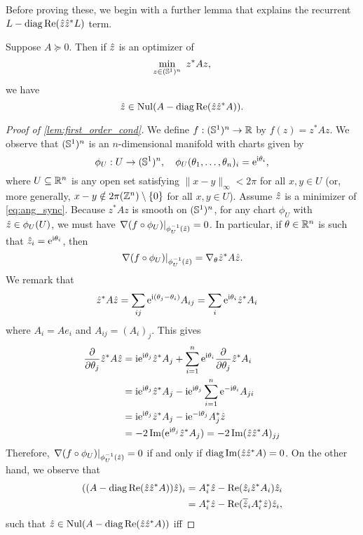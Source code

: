 Before proving these, we begin with a further lemma that explains the recurrent $L - \operatorname{diag} \operatorname{Re} (\hat{z} \hat{z}^* L)$ term.

\begin{lemma}
  Suppose $A \succeq 0$.  Then if $\hat{z}$ is an optimizer of \[\min\limits_{z \in (\mathbb{S}^1)^n} \ z^* A z,\] we have \[\hat{z} \in \operatorname{Nul} (A - \operatorname{diag} \operatorname{Re} (\hat{z} \hat{z}^* A)).\] \label{lem:first_order_cond}  
\end{lemma}

\begin{proof}[Proof of \cref{lem:first_order_cond}]
  We define $f : (\mathbb{S}^1)^n \to \mathbb{R}$ by $f(z) = z^* A z$.  We observe that $(\mathbb{S}^1)^n$ is an $n$-dimensional manifold with charts given by \[\phi_U : U \to (\mathbb{S}^1)^n,\quad \phi_U(\theta_1, \ldots, \theta_n)_i = \mathrm{e}^{\mathrm{i} \theta_i},\] where $U \subseteq \mathbb{R}^n$ is any open set satisfying $\lVert x - y\rVert_\infty < 2 \pi$ for all $x, y \in U$ (or, more generally, $x - y \notin 2 \pi (\mathbb{Z}^n) \setminus \{0\}$ for all $x, y \in U$).  Assume $\hat{z}$ is a minimizer of \eqref{eq:ang_sync}.  Because $z^* A z$ is smooth on $(\mathbb{S}^1)^n$, for any chart $\phi_U$ with $\hat{z} \in \phi_U(U)$, we must have $\left.\nabla (f \circ \phi_U)\right|_{\phi_U^{-1}(\hat{z})} = 0$.  In particular, if $\theta \in \mathbb{R}^n$ is such that $\hat{z}_i = \mathrm{e}^{\mathrm{i} \theta_i}$, then \[\left.\nabla (f \circ \phi_U)\right|_{\phi_U^{-1}(\hat{z})} = \nabla_\theta \hat{z}^* A \hat{z}.\]  We remark that \begin{align*} \hat{z}^* A \hat{z} &= \sum_{ij} \mathrm{e}^{\mathrm{i} (\theta_j - \theta_i)} A_{ij} = \sum_i \mathrm{e}^{\mathrm{i} \theta_i} \hat{z}^* A_i \end{align*} where $A_i = A e_i$ and $A_{ij} = (A_i)_j$.  This gives \begin{align*} \frac{\partial}{\partial \theta_j} \hat{z}^* A \hat{z} &= \mathrm{i} \mathrm{e}^{\mathrm{i} \theta_j} \hat{z}^* A_j + \sum_{i = 1}^n \mathrm{e}^{\mathrm{i} \theta_i} \frac{\partial}{\partial \theta_j} \hat{z}^* A_i \\ &= \mathrm{i} \mathrm{e}^{\mathrm{i} \theta_j} \hat{z}^* A_j - \mathrm{i} \mathrm{e}^{\mathrm{i} \theta_j} \sum_{i = 1}^n \mathrm{e}^{-\mathrm{i} \theta_i} A_{ji} \\ &= \mathrm{i} \mathrm{e}^{\mathrm{i} \theta_j} \hat{z}^* A_j - \mathrm{i}\mathrm{e}^{-\mathrm{i} \theta_j} A_j^* \hat{z} \\ &= -2 \operatorname{Im}(\mathrm{e}^{\mathrm{i} \theta_j} \hat{z}^* A_j) = -2 \operatorname{Im} (\hat{z} \hat{z}^* A)_{jj}\end{align*}  Therefore, $\left.\nabla (f \circ \phi_U)\right|_{\phi_U^{-1}(\hat{z})} = 0$ if and only if $\operatorname{diag} \operatorname{Im}(\hat{z} \hat{z}^* A) = 0$.  On the other hand, we observe that \begin{align*} ((A - \operatorname{diag} \operatorname{Re}(\hat{z} \hat{z}^* A)) \hat{z})_i &= A_i^* \hat{z} - \operatorname{Re}(\hat{z}_i \hat{z}^* A_i) \hat{z}_i \\ &= A_i^* \hat{z} - \operatorname{Re}(\overline{\hat{z}}_i A_i^* \hat{z}) \hat{z}_i,\end{align*} such that $\hat{z} \in \operatorname{Nul}(A - \operatorname{diag} \operatorname{Re}(\hat{z} \hat{z}^* A))$ iff

\end{proof}
